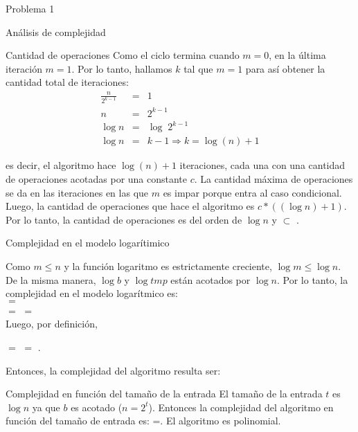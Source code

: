 \begin{section}{Problema 1}
\begin{subsection}{Análisis de complejidad}
\begin{subsubsection}{Cantidad de operaciones}
			\noindent Como el ciclo termina cuando $m=0$, en la última iteración $m=1$. Por lo tanto, hallamos $k$ tal que $m=1$ para así obtener la cantidad total de iteraciones:
			\begin{eqnarray*}
				\frac{n}{2^{k-1}}&=& 1 \\
				n &=& 2^{k-1} \\
				\log n &=& \log\; 2^{k-1} \\
				\log n &=& k-1 \Rightarrow k = \log( n )+1
			\end{eqnarray*}

			\noindent es decir, el algoritmo hace $\log(n)+1$ iteraciones, cada una con una cantidad de operaciones acotadas por una constante $c$. La cantidad máxima de
			operaciones se da en las iteraciones en las que $m$ es impar porque entra al caso condicional. Luego, la cantidad de operaciones que hace el algoritmo es $c*((\log n)+1)$.
			Por lo tanto, la cantidad de operaciones es del orden de $\log n$ y  $\subset$ .

		\end{subsubsection}


		\begin{subsubsection}{Complejidad en el modelo logarítimico}

			Como $m\leq n$ y la función logaritmo es estrictamente creciente, $\log m \leq \log n$. De la misma manera, $\log b$ y $\log tmp$ están acotados por $\log n$. Por lo tanto, la complejidad en el modelo logarítmico es: \\
			 $=$ \\
			$=$  $=$  \\

			Luego, por definición, 
			\begin{center}
				 $=$  $=$ .
			\end{center}

			Entonces, la complejidad del algoritmo resulta ser: 
		
		\end{subsubsection}


		\begin{subsubsection}{Complejidad en función del tamaño de la entrada}
			El tamaño de la entrada $t$ es $\log n$ ya que $b$ es acotado ($n=2^t$). Entonces la complejidad del algoritmo en función del tamaño de entrada es: =. El algoritmo es polinomial.
		\end{subsubsection}


\end{subsection}
\end{section}
